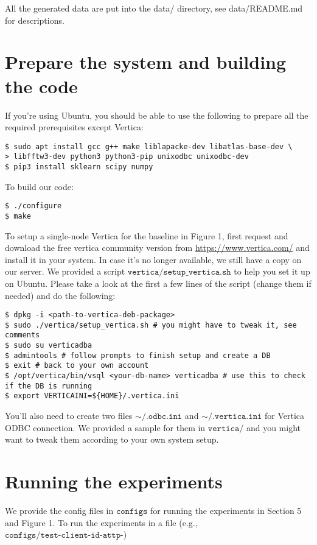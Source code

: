 \documentclass[11pt]{article}
\begin{document}
All the generated data are put into the data/ directory, see
data/README.md for descriptions.

\section{Prepare the system and building the code}
If you're using Ubuntu, you should be able to use the following to
prepare all the required prerequisites except Vertica:
\begin{verbatim}
$ sudo apt install gcc g++ make liblapacke-dev libatlas-base-dev \
> libfftw3-dev python3 python3-pip unixodbc unixodbc-dev
$ pip3 install sklearn scipy numpy
\end{verbatim}

To build our code:
\begin{verbatim}
$ ./configure
$ make
\end{verbatim}

To setup a single-node Vertica for the baseline in Figure 1, first
request and download the free vertica community version from
\url{https://www.vertica.com/} and install it in your system. In case
it's no longer available, we still have a copy on our server. We
provided a script $\texttt{vertica/setup\_vertica.sh}$ to help you set
it up on Ubuntu. Please take a look at the first a few lines of the
script (change them if needed) and do the following:
\begin{verbatim}
$ dpkg -i <path-to-vertica-deb-package>
$ sudo ./vertica/setup_vertica.sh # you might have to tweak it, see comments
$ sudo su verticadba
$ admintools # follow prompts to finish setup and create a DB
$ exit # back to your own account
$ /opt/vertica/bin/vsql <your-db-name> verticadba # use this to check if the DB is running
$ export VERTICAINI=${HOME}/.vertica.ini
\end{verbatim}
You'll also need to create two files $\mathtt{\sim/.odbc.ini}$ and
$\mathtt{\sim/.vertica.ini}$ for Vertica ODBC connection. We provided
a sample for them in $\texttt{vertica/}$ and you might want to tweak
them according to your own system setup.


\section{Running the experiments}


We provide the config files in $\texttt{configs}$ for running the
experiments in Section 5 and Figure 1. To run the experiments in a
file (e.g., $\texttt{configs/test-client-id-attp-}$)
\end{document}
